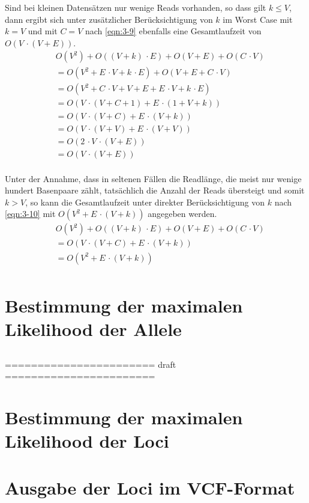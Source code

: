 Sind bei kleinen Datensätzen nur wenige Reads vorhanden, so dass gilt $ k \leq V $, dann ergibt sich unter zusätzlicher Berücksichtigung von $ k $ im Worst Case mit $ k = V $ und mit $ C = V $ nach \eqref{eqn:3-9} ebenfalls eine Gesamtlaufzeit von $ O(V \, \cdotp (V + E)) $.
\begin{equation} \label{eqn:3-9}
\tag{3-9}
\begin{aligned}
&\ {} O(V^2) + O((V + k) \, \cdotp E) + O(V + E) + O(C \, \cdotp V) \\
& \ = O(V^2 + E \, \cdotp V + k \, \cdotp E) + O(V + E + C \, \cdotp V)\\
&\ = O(V^2 + C \, \cdotp V + V + E + E \, \cdotp V + k \, \cdotp E) \\
&\ = O(V \, \cdotp (V + C + 1) + E \, \cdotp (1 + V + k))\\
&\ = O(V \, \cdotp (V + C) + E \, \cdotp (V + k))\\
&\ = O(V \, \cdotp (V + V) + E \, \cdotp (V + V))\\
&\ = O( 2 \, \cdotp V \, \cdotp (V + E))\\
&\ = O(V \, \cdotp (V + E))\\
\end{aligned}
\end{equation}

Unter der Annahme, dass in seltenen Fällen die Readlänge, die meist nur wenige hundert Basenpaare zählt, tatsächlich die Anzahl der Reads übersteigt und somit $ k > V $, so kann die Gesamtlaufzeit unter direkter Berücksichtigung von $ k $ nach \eqref{eqn:3-10} mit $ O(V^2 + E \, \cdotp (V + k)) $ angegeben werden.
\begin{equation} \label{eqn:3-10}
\tag{3-10}
\begin{aligned}
&\ {} O(V^2) + O((V + k) \, \cdotp E) + O(V + E) + O(C \, \cdotp V) \\
&\ = O(V \, \cdotp (V + C) + E \, \cdotp (V + k))\\
&\ = O(V^2 + E \, \cdotp (V + k))\\
\end{aligned}
\end{equation}

\section{Bestimmung der maximalen Likelihood der Allele} \label{sec:lh_allele}
\subsection{} \label{subsec:}
======================= draft =======================\\


\section{Bestimmung der maximalen Likelihood der Loci} \label{sec:lh_loci}
\subsection{} \label{subsec:}


\section{Ausgabe der Loci im VCF-Format} \label{sec:vcf}
\subsection{} \label{subsec:}
